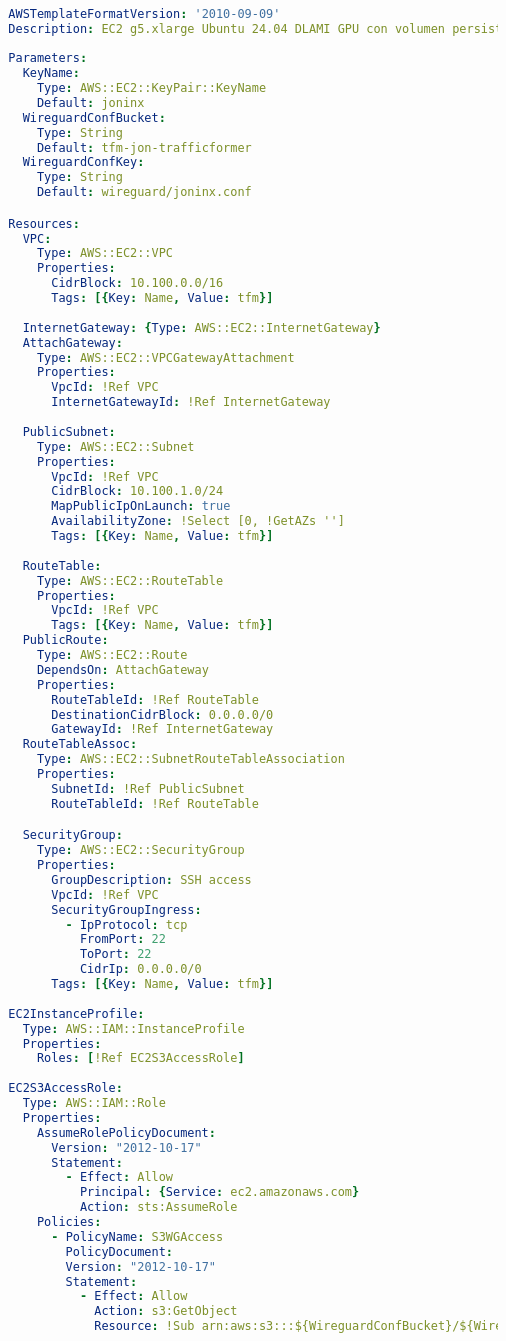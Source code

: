 \begin{lstlisting}[language=yaml, caption={Plantilla CloudFormation utilizada para el despliegue de entorno de entrenamiento}, label={lst:template_yaml}]

  AWSTemplateFormatVersion: '2010-09-09'
  Description: EC2 g5.xlarge Ubuntu 24.04 DLAMI GPU con volumen persistente y WireGuard
	
  Parameters:
    KeyName:
      Type: AWS::EC2::KeyPair::KeyName
      Default: joninx
    WireguardConfBucket:
      Type: String
      Default: tfm-jon-trafficformer
    WireguardConfKey:
      Type: String
      Default: wireguard/joninx.conf

  Resources:
    VPC:
      Type: AWS::EC2::VPC
      Properties:
        CidrBlock: 10.100.0.0/16
        Tags: [{Key: Name, Value: tfm}]
    
    InternetGateway: {Type: AWS::EC2::InternetGateway}
    AttachGateway:
      Type: AWS::EC2::VPCGatewayAttachment
      Properties:
        VpcId: !Ref VPC
        InternetGatewayId: !Ref InternetGateway
    
    PublicSubnet:
      Type: AWS::EC2::Subnet
      Properties:
        VpcId: !Ref VPC
        CidrBlock: 10.100.1.0/24
        MapPublicIpOnLaunch: true
        AvailabilityZone: !Select [0, !GetAZs '']
        Tags: [{Key: Name, Value: tfm}]
    
    RouteTable:
      Type: AWS::EC2::RouteTable
      Properties:
        VpcId: !Ref VPC
        Tags: [{Key: Name, Value: tfm}]
    PublicRoute:
      Type: AWS::EC2::Route
      DependsOn: AttachGateway
      Properties:
        RouteTableId: !Ref RouteTable
        DestinationCidrBlock: 0.0.0.0/0
        GatewayId: !Ref InternetGateway
    RouteTableAssoc:
      Type: AWS::EC2::SubnetRouteTableAssociation
      Properties:
        SubnetId: !Ref PublicSubnet
        RouteTableId: !Ref RouteTable

    SecurityGroup:
      Type: AWS::EC2::SecurityGroup
      Properties:
        GroupDescription: SSH access
        VpcId: !Ref VPC
        SecurityGroupIngress:
          - IpProtocol: tcp
            FromPort: 22
            ToPort: 22
            CidrIp: 0.0.0.0/0
        Tags: [{Key: Name, Value: tfm}]
  
  EC2InstanceProfile:
    Type: AWS::IAM::InstanceProfile
    Properties:
      Roles: [!Ref EC2S3AccessRole]
  
  EC2S3AccessRole:
    Type: AWS::IAM::Role
    Properties:
      AssumeRolePolicyDocument:
        Version: "2012-10-17"
        Statement:
          - Effect: Allow
            Principal: {Service: ec2.amazonaws.com}
            Action: sts:AssumeRole
      Policies:
        - PolicyName: S3WGAccess
          PolicyDocument:
          Version: "2012-10-17"
          Statement:
            - Effect: Allow
              Action: s3:GetObject
              Resource: !Sub arn:aws:s3:::${WireguardConfBucket}/${WireguardConfKey}
              

\end{lstlisting}
